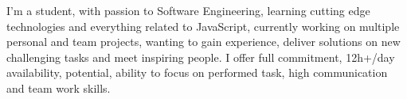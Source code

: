 

\begin{cvparagraph}


I'm a student, with passion to Software Engineering, learning cutting edge technologies and everything related to JavaScript, currently working on multiple personal and team projects, wanting to gain experience, deliver solutions on new challenging tasks and meet inspiring people. I offer full commitment, 12h+/day availability, potential, ability to focus on performed task, high communication and team work skills.
\end{cvparagraph}
